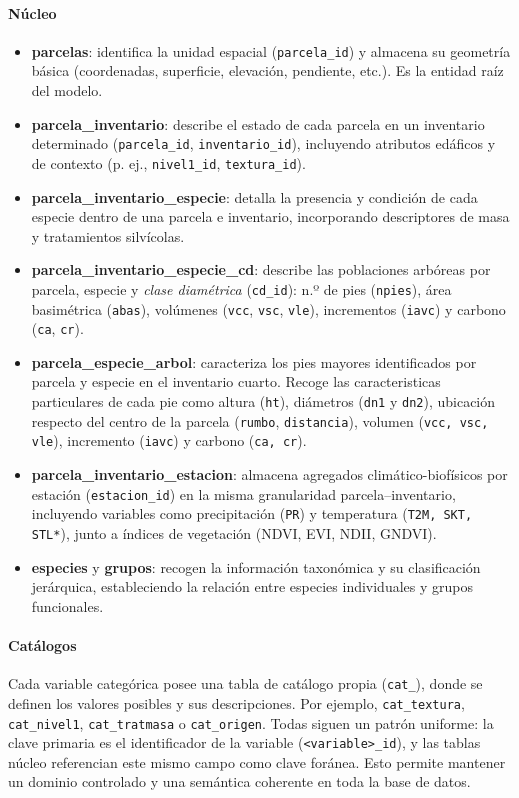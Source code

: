 \paragraph{Núcleo}
\begin{itemize}
  \item \textbf{parcelas}: identifica la unidad espacial (\texttt{parcela\_id}) y almacena su geometría básica (coordenadas, superficie, elevación, pendiente, etc.). Es la entidad raíz del modelo.
  \item \textbf{parcela\_inventario}: describe el estado de cada parcela en un inventario determinado (\texttt{parcela\_id}, \texttt{inventario\_id}), incluyendo atributos edáficos y de contexto (p. ej., \texttt{nivel1\_id}, \texttt{textura\_id}).
  \item \textbf{parcela\_inventario\_especie}: detalla la presencia y condición de cada especie dentro de una parcela e inventario, incorporando descriptores de masa y tratamientos silvícolas.
  \item \textbf{parcela\_inventario\_especie\_cd}: describe las poblaciones arbóreas por parcela, especie y \emph{clase diamétrica} (\texttt{cd\_id}): n.º de pies (\texttt{npies}), área basimétrica (\texttt{abas}), volúmenes (\texttt{vcc}, \texttt{vsc}, \texttt{vle}), incrementos (\texttt{iavc}) y carbono (\texttt{ca}, \texttt{cr}).
  \item \textbf{parcela\_especie\_arbol}: caracteriza los pies mayores identificados por parcela y especie en el inventario cuarto. Recoge las caracteristicas particulares de cada pie como altura (\texttt{ht}), diámetros (\texttt{dn1} y \texttt{dn2}), ubicación respecto del centro de la parcela (\texttt{rumbo}, \texttt{distancia}), volumen (\texttt{vcc, vsc, vle}), incremento (\texttt{iavc}) y carbono (\texttt{ca, cr}).  
  \item \textbf{parcela\_inventario\_estacion}: almacena agregados climático-biofísicos por estación (\texttt{estacion\_id}) en la misma granularidad parcela–inventario, incluyendo variables como precipitación (\texttt{PR}) y temperatura (\texttt{T2M, SKT, STL*}), junto a índices de vegetación (NDVI, EVI, NDII, GNDVI).
  \item \textbf{especies} y \textbf{grupos}: recogen la información taxonómica y su clasificación jerárquica, estableciendo la relación entre especies individuales y grupos funcionales.
\end{itemize}

\paragraph{Catálogos}
Cada variable categórica posee una tabla de catálogo propia (\texttt{cat\_}), donde se definen los valores posibles y sus descripciones. Por ejemplo, \texttt{cat\_textura}, \texttt{cat\_nivel1}, \texttt{cat\_tratmasa} o \texttt{cat\_origen}. Todas siguen un patrón uniforme: la clave primaria es el identificador de la variable (\texttt{<variable>\_id}), y las tablas núcleo referencian este mismo campo como clave foránea. Esto permite mantener un dominio controlado y una semántica coherente en toda la base de datos.

